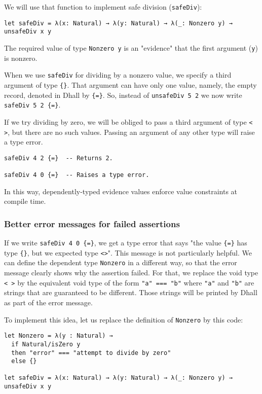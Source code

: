 We will use that function to implement safe division (\lstinline!safeDiv!):


\begin{lstlisting}[language=Dhall]
let safeDiv = λ(x: Natural) → λ(y: Natural) → λ(_: Nonzero y) → unsafeDiv x y
\end{lstlisting}


The required value of type \lstinline!Nonzero y! is an "evidence" that the first argument (\lstinline!y!) is nonzero.


When we use \lstinline!safeDiv! for dividing by a nonzero value, we specify a third argument of type \lstinline!{}!.
That argument can have only one value, namely, the empty record, denoted in Dhall by \lstinline!{=}!.
So, instead of \lstinline!unsafeDiv 5 2! we now write \lstinline!safeDiv 5 2 {=}!.


If we try dividing by zero, we will be obliged to pass a third argument of type \lstinline!< >!, but there are no such values.
Passing an argument of any other type will raise a type error.


\begin{lstlisting}[language=Dhall]
safeDiv 4 2 {=}  -- Returns 2.

safeDiv 4 0 {=}  -- Raises a type error. 
\end{lstlisting}


In this way, dependently-typed evidence values enforce value constraints at compile time.


\subsubsection{Better error messages for failed assertions}


If we write \lstinline!safeDiv 4 0 {=}!, we get a type error that says "the value \lstinline!{=}! has type \lstinline!{}!, but we expected type \lstinline!<>!".
This message is not particularly helpful.
We can define the dependent type \lstinline!Nonzero! in a different way, so that the error message clearly shows why the assertion failed.
For that, we replace the void type \lstinline!< >! by the equivalent void type of the form \lstinline!"a" === "b"! where \lstinline!"a"! and \lstinline!"b"! are strings that are guaranteed to be different.
Those strings will be printed by Dhall as part of the error message.


To implement this idea, let us replace the definition of \lstinline!Nonzero! by this code:


\begin{lstlisting}[language=Dhall]
let Nonzero = λ(y : Natural) →
  if Natural/isZero y
  then "error" === "attempt to divide by zero"
  else {}

let safeDiv = λ(x: Natural) → λ(y: Natural) → λ(_: Nonzero y) → unsafeDiv x y
\end{lstlisting}


